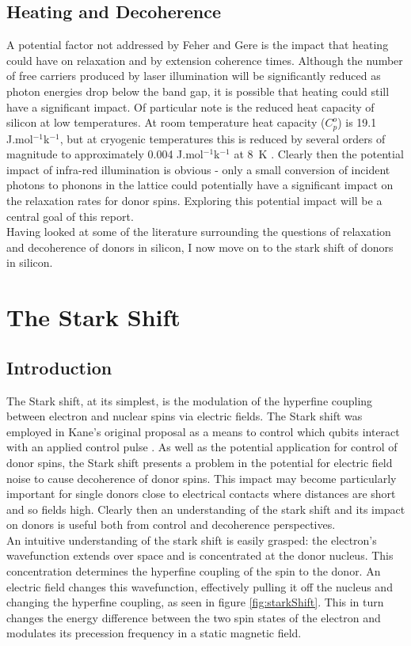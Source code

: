 \subsection{Heating and Decoherence}

A potential factor not addressed by Feher and Gere is the impact that heating could have on relaxation and by extension coherence times.
Although the number of free carriers produced by laser illumination will be significantly reduced as photon energies drop below the band gap, it is possible that heating could still have a significant impact.
Of particular note is the reduced heat capacity of silicon at low temperatures.
At room temperature heat capacity ($C_p^o$) is 19.1 J.mol$^{-1}$k$^{-1}$, but at cryogenic temperatures this is reduced by several orders of magnitude to approximately 0.004 J.mol$^{-1}$k$^{-1}$ at 8~K \cite{Desai1986,Niinikoski1986}.
Clearly then the potential impact of infra-red illumination is obvious - only a small conversion of incident photons to phonons in the lattice could potentially have a significant impact on the relaxation rates for donor spins.
Exploring this potential impact will be a central goal of this report.
\\
Having looked at some of the literature surrounding the questions of relaxation and decoherence of donors in silicon, I now move on to the stark shift of donors in silicon.

\section{The Stark Shift}
\label{sec:starkShiftLit}

\subsection{Introduction}

The Stark shift, at its simplest, is the modulation of the hyperfine coupling between electron and nuclear spins via electric fields.
The Stark shift was employed in Kane's original proposal as a means to control which qubits interact with an applied control pulse \cite{Kane1998}.
As well as the potential application for control of donor spins, the Stark shift presents a problem in the potential for electric field noise to cause decoherence of donor spins.
This impact may become particularly important for single donors close to electrical contacts where distances are short and so fields high.
Clearly then an understanding of the stark shift and its impact on donors is useful both from control and decoherence perspectives.
\\
An intuitive understanding of the stark shift is easily grasped: the electron's wavefunction extends over space and is concentrated at the donor nucleus.
This concentration determines the hyperfine coupling of the spin to the donor.
An electric field changes this wavefunction, effectively pulling it off the nucleus and changing the hyperfine coupling, as seen in figure \ref{fig:starkShift}.
This in turn changes the energy difference between the two spin states of the electron and modulates its precession frequency in a static magnetic field.

